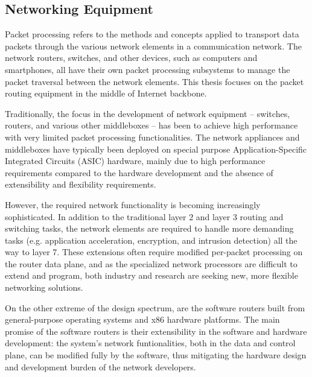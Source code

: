 \subsection{Networking Equipment}

Packet processing refers to the methods and concepts applied to transport data packets through the various network elements in a communication network. The network routers, switches, and other devices, such as computers and smartphones, all have their own packet processing subsystems to manage the packet traversal between the network elements. This thesis focuses on the packet routing equipment in the middle of Internet backbone.




Traditionally, the focus in the development of network equipment -- switches, routers, and various other middleboxes -- has been to achieve high performance with very limited packet processing functionalities. The network appliances and middleboxes have typically been deployed on special purpose Application-Specific Integrated Circuits (ASIC) hardware, mainly due to high performance requirements compared to the hardware development and the absence of extensibility and flexibility requirements.~\cite{Dobrescu:2009:REP}

However, the required network functionality is becoming increasingly sophisticated. In addition to the traditional layer 2 and layer 3 routing and switching tasks, the network elements are required to handle more demanding tasks (e.g. application acceleration, encryption, and intrusion detection) all the way to layer 7. These extensions often require modified per-packet processing on the router data plane, and as the specialized network processors are difficult to extend and program, both industry and research are seeking new, more flexible networking solutions.~\cite{Egi:2009:PP, Dobrescu:2009:REP}

On the other extreme of the design spectrum, are the software routers built from general-purpose operating systems and x86 hardware platforms. The main promise of the software routers is their extensibility in the software and hardware development: the system's network funtionalities, both in the data and control plane, can be modified fully by the software, thus mitigating the hardware design and development burden of the network developers.~\cite{Dobrescu:2009:REP}

